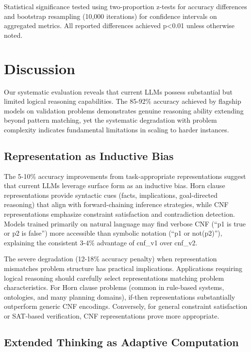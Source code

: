 \documentclass[pdflatex,sn-mathphys-num]{sn-jnl}%
\theoremstyle{thmstyleone}%
\theoremstyle{thmstyletwo}%
\theoremstyle{thmstylethree}%
\begin{document}
Statistical significance tested using two-proportion z-tests for accuracy differences and bootstrap resampling (10,000 iterations) for confidence intervals on aggregated metrics. All reported differences achieved p<0.01 unless otherwise noted.

\section{Discussion}\label{sec:discussion}

Our systematic evaluation reveals that current LLMs possess substantial but limited logical reasoning capabilities. The 85-92\% accuracy achieved by flagship models on validation problems demonstrates genuine reasoning ability extending beyond pattern matching, yet the systematic degradation with problem complexity indicates fundamental limitations in scaling to harder instances.

\subsection{Representation as Inductive Bias}\label{subsec:disc-representation}

The 5-10\% accuracy improvements from task-appropriate representations suggest that current LLMs leverage surface form as an inductive bias. Horn clause representations provide syntactic cues (facts, implications, goal-directed reasoning) that align with forward-chaining inference strategies, while CNF representations emphasize constraint satisfaction and contradiction detection. Models trained primarily on natural language may find verbose CNF (``p1 is true or p2 is false'') more accessible than symbolic notation (``p1 or not(p2)''), explaining the consistent 3-4\% advantage of cnf\_v1 over cnf\_v2.

The severe degradation (12-18\% accuracy penalty) when representation mismatches problem structure has practical implications. Applications requiring logical reasoning should carefully select representations matching problem characteristics. For Horn clause problems (common in rule-based systems, ontologies, and many planning domains), if-then representations substantially outperform generic CNF encodings. Conversely, for general constraint satisfaction or SAT-based verification, CNF representations prove more appropriate.

\subsection{Extended Thinking as Adaptive Computation}\label{subsec:disc-thinking}
\end{document}

